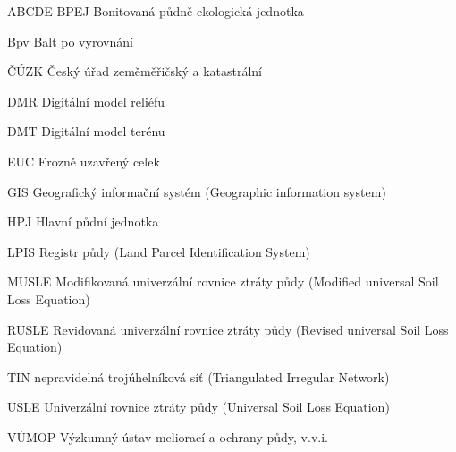 \begin{seznamzkratek}{ABCDE}
	      {BPEJ}
	      {Bonitovaná půdně ekologická jednotka}

	      {Bpv}
	      {Balt po vyrovnání}

	      {ČÚZK}
	      {Český úřad zeměměřičský a katastrální}

	      {DMR}
	      {Digitální model reliéfu}

	      {DMT}
	      {Digitální model terénu}

	      {EUC}
	      {Erozně uzavřený celek}

	      {GIS}
	      {Geografický informační systém (Geographic information system)}	

	      {HPJ}
	      {Hlavní půdní jednotka}	

	      {LPIS}
	      {Registr půdy (Land Parcel Identification System)}

	      {MUSLE}
	      {Modifikovaná univerzální rovnice ztráty půdy (Modified universal Soil Loss Equation)}

	      {RUSLE}
	      {Revidovaná univerzální rovnice ztráty půdy (Revised universal Soil Loss Equation)}

	      {TIN}
	      {nepravidelná trojúhelníková síť (Triangulated Irregular Network)}

	      {USLE}
	      {Univerzální rovnice ztráty půdy (Universal Soil Loss Equation)}

	      {VÚMOP}
	      {Výzkumný ústav meliorací a ochrany půdy, v.v.i.}

\end{seznamzkratek}